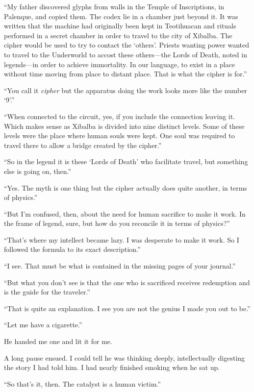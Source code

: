 \documentclass[
]{article}
\begin{document}
``My father discovered glyphs from walls in the Temple of Inscriptions,
in Palenque, and copied them. The codex lie in a chamber just beyond it.
It was written that the machine had originally been kept in Teotihuacan
and rituals performed in a secret chamber in order to travel to the city
of Xibalba. The cipher would be used to try to contact the `others'.
Priests wanting power wanted to travel to the Underworld to accost these
others---the Lords of Death, noted in legends---in order to achieve
immortality. In our language, to exist in a place without time moving
from place to distant place. That is what the cipher is for.''

``You call it \emph{cipher} but the apparatus doing the work looks more
like the number `9'.''

``When connected to the circuit, yes, if you include the connection
leaving it. Which makes sense as Xibalba is divided into nine distinct
levels. Some of these levels were the place where human souls were kept.
One soul was required to travel there to allow a bridge created by the
cipher.''

``So in the legend it is these `Lords of Death' who facilitate travel,
but something else is going on, then.''

``Yes. The myth is one thing but the cipher actually does quite another,
in terms of physics.''

``But I'm confused, then, about the need for human sacrifice to make it
work. In the frame of legend, sure, but how do you reconcile it in terms
of physics?''

``That's where my intellect became lazy. I was desperate to make it
work. So I followed the formula to its exact description.''

``I see. That must be what is contained in the missing pages of your
journal.''

``But what you don't see is that the one who is sacrificed receives
redemption and is the guide for the traveler.''

``That is quite an explanation. I see you are not the genius I made you
out to be.''

``Let me have a cigarette.''

He handed me one and lit it for me.

A long pause ensued. I could tell he was thinking deeply, intellectually
digesting the story I had told him. I had nearly finished smoking when
he sat up.

``So that's it, then. The catalyst is a human victim.''
\end{document}
